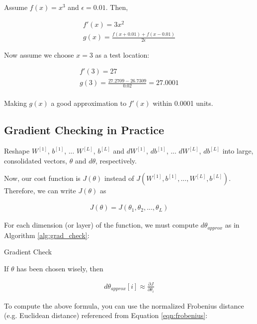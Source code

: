 \documentclass{article}
\begin{document}
Assume $f(x) = x^3$ and $\epsilon = 0.01$.  Then,

\begin{gather}
f'(x) = 3 x^2 \\
g(x) = \frac{f(x + 0.01) + f(x - 0.01)}{2 \epsilon}
\end{gather}

Now assume we choose $x = 3$ as a test location:

\begin{gather}
f'(3) = 27 \\
g(3) = \frac{27.2709 - 26.7309}{0.02} = 27.0001
\end{gather}
\\
Making $g(x)$ a good approximation to $f'(x)$ within 0.0001 units.

\subsection{Gradient Checking in Practice}

Reshape $W^{[1]}$, $b^{[1]}$, ... $W^{[L]}$, $b^{[L]}$ and $dW^{[1]}$, $db^{[1]}$, ... $dW^{[L]}$, $db^{[L]}$ into large, consolidated vectors, $\theta$ and $d\theta$, respectively.

Now, our cost function is $J(\theta)$ instead of $J(W^{[1]}, b^{[1]}, ..., W^{[L]}, b^{[L]})$.  Therefore, we can write $J(\theta)$ as

\begin{align}
J(\theta) = J(\theta_1, \theta_2, ..., \theta_L)
\end{align}

For each dimension (or layer) of the function, we must compute $d\theta_{approx}$ as in Algorithm \ref{alg:grad_check}:

\begin{algorithm}[h]
\caption{Gradient Check}
\label{alg:grad_check}
\end{algorithm}

If $\theta$ has been chosen wisely, then

\begin{align}
d\theta_{approx}[i] \approx \frac{\partial{J}}{\partial{\theta_i}}
\end{align}

To compute the above formula, you can use the normalized Frobenius distance (e.g. Euclidean distance) referenced from Equation \ref{eqn:frobenius}:
\end{document}
